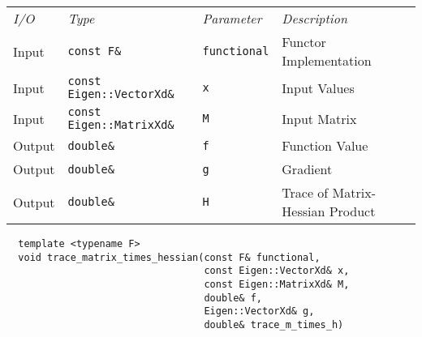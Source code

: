 \begin{tcolorbox}[colback=white,colframe=gray90, coltitle=black,boxrule=3pt,
fonttitle=\bfseries,title=Trace of Matrix-Hessian Product]

\begin{tabular}{llll}
\textit{I/O} & \textit{Type} & \textit{Parameter} & \textit{Description} \\
Input & \texttt{const F\&} & \texttt{functional} & Functor Implementation \\
Input & \texttt{const Eigen::VectorXd\&} & \texttt{x} & Input Values \\
Input & \texttt{const Eigen::MatrixXd\&} & \texttt{M} & Input Matrix \\
Output & \texttt{double\&} & \texttt{f} & Function Value \\
Output & \texttt{double\&} & \texttt{g} & Gradient \\
Output & \texttt{double\&} & \texttt{H} & Trace of Matrix-Hessian Product
\end{tabular}

\vspace{5mm}

\begin{verbatim}
  template <typename F>
  void trace_matrix_times_hessian(const F& functional,
                                  const Eigen::VectorXd& x,
                                  const Eigen::MatrixXd& M,
                                  double& f,
                                  Eigen::VectorXd& g,
                                  double& trace_m_times_h)
\end{verbatim}

\end{tcolorbox}

